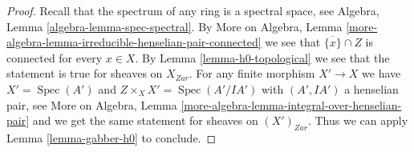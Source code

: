 \documentclass[10pt,a4paper]{amsart}
\theoremstyle{plain}
\theoremstyle{definition}
\theoremstyle{remark}
\numberwithin{equation}{subsection}
\def\Spec{\mathop{\mathrm{Spec}}}
\begin{document}
\begin{proof}
Recall that the spectrum of any ring is a spectral space, see
Algebra, Lemma \ref{algebra-lemma-spec-spectral}. By
More on Algebra, Lemma
\ref{more-algebra-lemma-irreducible-henselian-pair-connected}
we see that $\overline{\{x\}} \cap Z$ is connected for every $x \in X$.
By Lemma \ref{lemma-h0-topological} we see that the statement
is true for sheaves on $X_{Zar}$. For any finite morphism $X' \to X$
we have $X' = \Spec(A')$ and $Z \times_X X' = \Spec(A'/IA')$
with $(A', IA')$ a henselian pair, see More on Algebra, Lemma
\ref{more-algebra-lemma-integral-over-henselian-pair}
and we get the same statement for sheaves on $(X')_{Zar}$.
Thus we can apply Lemma \ref{lemma-gabber-h0} to conclude.
\end{proof}
\end{document}
